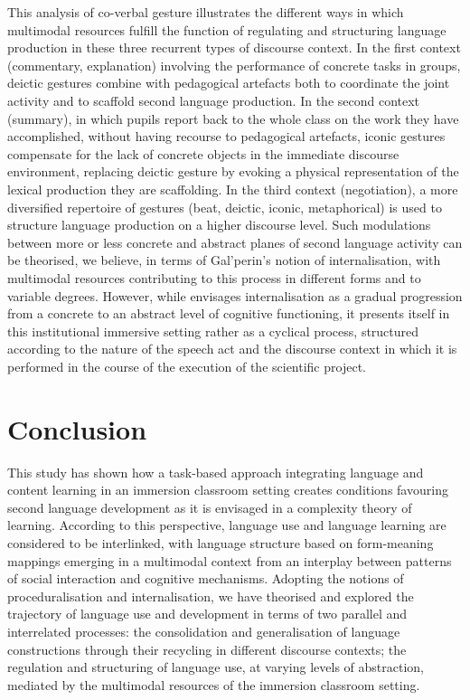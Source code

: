 \documentclass[output=paper]{langscibook}
\begin{document}
\begin{sloppypar}
This analysis of co-verbal gesture illustrates the different ways in which multimodal resources fulfill the function of regulating and structuring language production in these three recurrent types of discourse context. In the first context (commentary, explanation) involving the performance of concrete tasks in groups, deictic gestures combine with pedagogical artefacts both to coordinate the joint activity and to scaffold second language production. In the second context (summary), in which pupils report back to the whole class on the work they have accomplished, without having recourse to pedagogical artefacts, iconic gestures compensate for the lack of concrete objects in the immediate discourse environment, replacing deictic gesture by evoking a physical representation of the lexical production they are scaffolding. In the third context (negotiation), a more diversified repertoire of gestures (beat, deictic, iconic, metaphorical) is used to structure language production on a higher discourse level. Such modulations between more or less concrete and abstract planes of second language activity can be theorised, we believe, in terms of Gal’perin’s notion of internalisation, with multimodal resources contributing to this process in different forms and to variable degrees. However, while \citet{Galperin1967} envisages internalisation as a gradual progression from a concrete to an abstract level of cognitive functioning, it presents itself in this institutional immersive setting rather as a cyclical process, structured according to the nature of the speech act and the discourse context in which it is performed in the course of the execution of the scientific project.\end{sloppypar}

\section{Conclusion} %

This study has shown how a task-based approach integrating language and content learning in an immersion classroom setting creates conditions favouring second language development as it is envisaged in a complexity theory of learning. According to this perspective, language use and language learning are considered to be interlinked, with language structure based on form-meaning mappings emerging in a multimodal context from an interplay between patterns of social interaction and cognitive mechanisms. Adopting the notions of proceduralisation and internalisation, we have theorised and explored the trajectory of language use and development in terms of two parallel and interrelated processes: the consolidation and generalisation of language constructions through their recycling in different discourse contexts; the regulation and structuring of language use, at varying levels of abstraction, mediated by the multimodal resources of the immersion classroom setting.  
\end{document}
